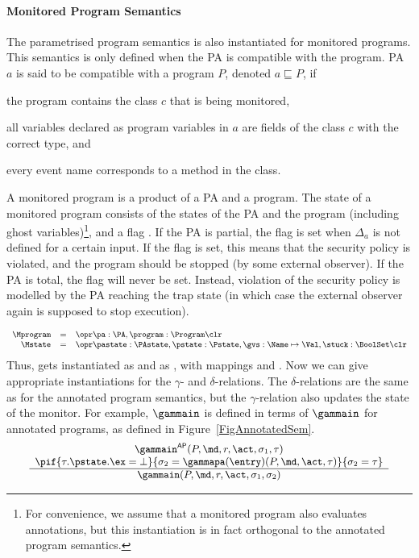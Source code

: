 \paragraph{Monitored Program Semantics}
The parametrised program semantics is also instantiated for monitored
programs. This semantics is only defined when the PA is compatible
with the program. PA \(a\) is said to be compatible with a program
\(P\), denoted \(a \sqsubseteq P\), if
\begin{inparaenum}
\item the program contains the class \(c\) that is being monitored,
\item all variables declared as program variables in
\(a\) are fields of the class \(c\) with the correct type, and
\item every event name corresponds to a method in the class.
\end{inparaenum}
A monitored program is a product of a PA and a program. The state of a
monitored program consists of the states of the PA and the program
(including ghost variables)\footnote{For convenience, we assume that a
monitored program also evaluates annotations, but this instantiation
is in fact orthogonal to the annotated program semantics.}, and a flag
\stuck. If the PA is partial, the flag
\stuck is set when \(\Delta_a\) is not defined for a
certain input. If the flag is set, this means that the security policy
is violated, and the program should be stopped (by some external
observer). If the PA is total, the \stuck flag will never be
set. Instead, violation of the security policy is modelled by the PA
reaching the trap state \halted (in which case the external observer
again is supposed to stop execution).

\vspace*{-1em}
\[
{\small
\begin{array}{rcl}
\Mprogram & =  & \opr \pa : \PA, \program : \Program \clr\\
\Mstate & = & \opr \pastate : \PAstate, \pstate : \Pstate, \gvs :  \Name \mapsto \Val, \stuck
: \BoolSet \clr
\end{array}}
\]
Thus, \FullProgram gets instantiated as \Mprogram and \FullState as
\Mstate, with mappings \program and \pstate. Now we can give
appropriate instantiations for the \(\gamma\)- and
\(\delta\)-relations. The \(\delta\)-relations are the same as
for the annotated program semantics, but the \(\gamma\)-relation also
updates the state of the monitor. For example, \(\gammain\) is defined
in terms of \(\gammain\) for annotated programs, as defined in
Figure~\ref{FigAnnotatedSem}.
\[
{\small
\begin{array}{c}
\gammain^{\mathsf{AP}}(P, \md, r, \act, \sigma_1, \tau) \\
\pif{\tau.\pstate.\ex = \bot}
    {\sigma_2 = \gammapa(\entry)(P, \md, \act, \tau)}
    {\sigma_2 = \tau}\\
\hline
\gammain(P, \md, r, \act, \sigma_1, \sigma_2)
\end{array}}
\]


